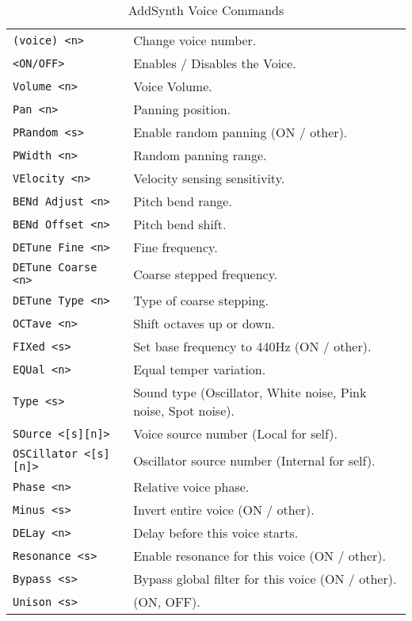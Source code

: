    \begin{table}[H]
      \caption{AddSynth Voice Commands}
      \label{table:yoshimi_part_addsynth_voice_commands}
      \begin{tabular}{l l}
\texttt{(voice) <n>} &
   Change voice number.  \\
\texttt{<ON/OFF>} &
   Enables / Disables the Voice. \\
\texttt{Volume <n>} &
   Voice Volume.  \\
\texttt{Pan <n>} &
   Panning position.\\
\texttt{PRandom <s>} &
   Enable random panning (ON / other).\\
\texttt{PWidth <n>} &
   Random panning range.\\
\texttt{VElocity <n>} &
   Velocity sensing sensitivity. \\
\texttt{BENd Adjust <n>} &
   Pitch bend range. \\
\texttt{BENd Offset <n>} &
   Pitch bend shift. \\
\texttt{DETune Fine <n>} &
   Fine frequency.   \\
\texttt{DETune Coarse <n>} &
   Coarse stepped frequency.  \\
\texttt{DETune Type <n>} &
   Type of coarse stepping.   \\
\texttt{OCTave <n>} &
   Shift octaves up or down.  \\
\texttt{FIXed <s>} &
   Set base frequency to 440Hz (ON / other).  \\
\texttt{EQUal <n>} &
   Equal temper variation. \\
\texttt{Type <s>} &
   Sound type (Oscillator, White noise, Pink noise, Spot noise). \\
\texttt{SOurce <[s][n]>} &
   Voice source number (Local for self). \\
\texttt{OSCillator <[s][n]>} &
   Oscillator source number (Internal for self). \\
\texttt{Phase <n>} &
   Relative voice phase. \\
\texttt{Minus <s>} &
   Invert entire voice (ON / other). \\
\texttt{DELay <n>} &
   Delay before this voice starts. \\
\texttt{Resonance <s>} &
   Enable resonance for this voice (ON / other). \\
\texttt{Bypass <s>} &
   Bypass global filter for this voice (ON / other). \\
\texttt{Unison <s>} &
   (ON, OFF). \\

\end{tabular}
\end{table}
